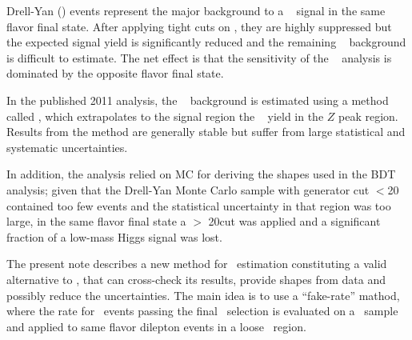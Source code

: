 Drell-Yan (\dyll) events represent the major background to a \hww~ signal in the same flavor final state.
After applying tight cuts on \met, they are highly suppressed but the expected signal yield is significantly 
reduced and the remaining \dyll~ background is difficult to estimate.
The net effect is that the sensitivity of the \hww~ analysis is dominated by the opposite flavor final state.

In the published 2011 analysis\cite{ref:hwwpaper}, the \dyll~ background is estimated using a method called \routin\cite{ref:hwwsmurfs}, 
which extrapolates to the signal region the \dyll~ yield in the $Z$ peak region. 
Results from the \routin method are generally stable but suffer from large statistical and systematic uncertainties.

In addition, the analysis relied on MC for deriving the shapes used in the BDT analysis; 
given that the Drell-Yan Monte Carlo sample with generator cut \mll$<$20 \GeVcc contained too few events and the statistical uncertainty 
in that region was too large, in the same flavor final state a \mll$>$ 20\GeVcc cut was applied and a significant fraction 
of a low-mass Higgs signal was lost.

The present note describes a new method for \dyll~estimation constituting a valid alternative 
to \routin, that can cross-check its results, provide shapes from data and possibly reduce the uncertainties.
The main idea is to use a ``fake-rate'' mathod, where the rate for \dyll\ events passing the final \met\ selection
is evaluated on a \gjets\ sample and applied to same flavor dilepton events in a loose \met\ region. 
